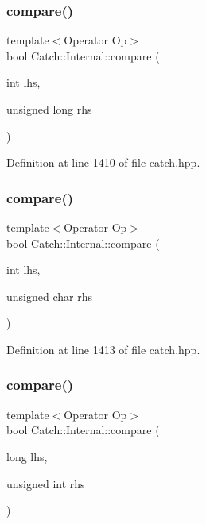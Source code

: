 \subsubsection{\texorpdfstring{compare()}{compare()}\hspace{0.1cm}{\footnotesize\ttfamily [9/17]}}
{\footnotesize\ttfamily template$<$Operator Op$>$ \\
bool Catch\+::\+Internal\+::compare (\begin{DoxyParamCaption}\item[{int}]{lhs,  }\item[{unsigned long}]{rhs }\end{DoxyParamCaption})}



Definition at line 1410 of file catch.\+hpp.

\hypertarget{namespace_catch_1_1_internal_a7e82d987f62b9822107027c72a55fa6b}{}\label{namespace_catch_1_1_internal_a7e82d987f62b9822107027c72a55fa6b} 
\subsubsection{\texorpdfstring{compare()}{compare()}\hspace{0.1cm}{\footnotesize\ttfamily [10/17]}}
{\footnotesize\ttfamily template$<$Operator Op$>$ \\
bool Catch\+::\+Internal\+::compare (\begin{DoxyParamCaption}\item[{int}]{lhs,  }\item[{unsigned char}]{rhs }\end{DoxyParamCaption})}



Definition at line 1413 of file catch.\+hpp.

\hypertarget{namespace_catch_1_1_internal_a0b4783ede1901e5c1baf8ff909bcce8d}{}\label{namespace_catch_1_1_internal_a0b4783ede1901e5c1baf8ff909bcce8d} 
\subsubsection{\texorpdfstring{compare()}{compare()}\hspace{0.1cm}{\footnotesize\ttfamily [11/17]}}
{\footnotesize\ttfamily template$<$Operator Op$>$ \\
bool Catch\+::\+Internal\+::compare (\begin{DoxyParamCaption}\item[{long}]{lhs,  }\item[{unsigned int}]{rhs }\end{DoxyParamCaption})}



